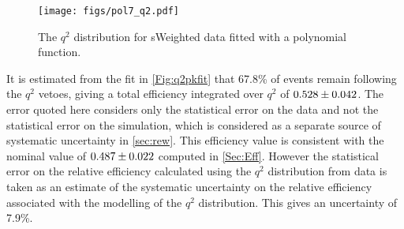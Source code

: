 \begin{figure}[h!]
  \def\nh{0.7\textwidth}
  \centering
  \texttt{[image: figs/pol7\_q2.pdf]}
  
    \caption{The $q^{2}$ distribution for sWeighted \LbK data fitted with a polynomial function.}
  \label{Fig:q2pkfit}
\end{figure}

It is estimated from the fit in \autoref{Fig:q2pkfit} that 67.8\% of \LbK events remain following the $q^{2}$ vetoes, giving a total efficiency integrated over $q^{2}$ of $\twq2$. The error quoted here considers only the statistical error on the \LbK data and not the statistical error on the simulation, which is considered as a separate source of systematic uncertainty in \autoref{sec:rew}.  This efficiency value is consistent with the nominal value of $0.487\pm0.022$ computed in \autoref{Sec:Eff}. However the statistical error on the relative efficiency calculated using the $q^{2}$ distribution from \LbK data is taken as an estimate of the systematic uncertainty on the relative efficiency associated with the modelling of the $q^{2}$ distribution. This gives an uncertainty of 7.9\%. %

